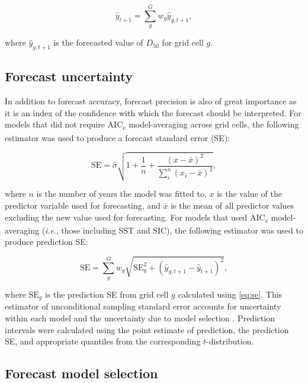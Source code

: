 \documentclass[12pt,]{book}
\theoremstyle{definition}
\theoremstyle{definition}
\theoremstyle{definition}
\theoremstyle{remark}
\begin{document}
\begin{equation}
  \hat{y}_{t+1}=\sum_g^G w_g \hat{y}_{g,t+1},
\label{eq:grid-avg-fcst}
\end{equation}

\noindent
where \(\hat{y}_{g,t+1}\) is the forecasted value of \(D_{50}\) for grid
cell \(g\).

\subsection{Forecast uncertainty}\label{forecast-uncertainty}

\noindent
In addition to forecast accuracy, forecast precision is also of great
importance as it is an index of the confidence with which the forecast
should be interpreted. For models that did not require
AIC\textsubscript{c} model-averaging across grid cells, the following
estimator was used to produce a forecast standard error (SE):

\begin{equation}
  \text{SE}=\hat{\sigma} \sqrt{1 + \frac{1}{n} + \frac{(x-\bar{x})^2}{\sum_i^n(x_i-\bar{x})^2}},
\label{eq:se}
\end{equation}

\noindent
where \(n\) is the number of years the model was fitted to, \(x\) is the
value of the predictor variable used for forecasting, and \(\bar{x}\) is
the mean of all predictor values excluding the new value used for
forecasting. For models that used AIC\textsubscript{c} model-averaging
(\emph{i}.\emph{e}., those including SST and SIC), the following
estimator was used to produce prediction SE:

\begin{equation}
  \text{SE}=\sum_g^G w_g \sqrt{\text{SE}_g^2+(\hat{y}_{g,t+1}-\hat{y}_{t+1})^2},
\label{eq:mod-avg-se}
\end{equation}

\noindent
where \(\text{SE}_g\) is the prediction SE from grid cell \(g\)
calculated using \eqref{eq:se}. This estimator of unconditional sampling
standard error accounts for uncertainty within each model and the
uncertainty due to model selection \citep{burnham-anderson-2002}.
Prediction intervals were calculated using the point estimate of
prediction, the prediction SE, and appropriate quantiles from the
corresponding \(t\)-distribution.

\subsection{Forecast model selection}\label{model-selection}
\end{document}
